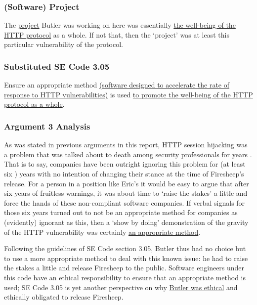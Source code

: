 \documentclass[11pt]{article}
\begin{document}
\begin{multicols}{2}
\subsubsection{(Software) Project}
The \uline{project} Butler was working on here was essentially \uline{the well-being of the HTTP protocol} as a whole. If not that, then the `project' was at least this particular vulnerability of the protocol.

\subsubsection{Substituted SE Code 3.05}
Ensure an appropriate method \uline{(software designed to accelerate the rate of response to HTTP vulnerabilities)} is used \uline{to promote the well-being of the HTTP protocol as a whole}.

\subsubsection{Argument 3 Analysis}
As was stated in previous arguments in this report, HTTP session hijacking was a problem that was talked about to death among security professionals for years \cite{firesheep-day-later}. That is to say, companies have been outright ignoring this problem for (at least six \cite{firesheep-day-later}) years with no intention of changing their stance at the time of Firesheep's release. For a person in a position like Eric's it would be easy to argue that after six years of fruitless warnings, it was about time to `raise the stakes' a little and force the hands of these non-compliant software companies. If verbal signals for those six years turned out to not be an appropriate method for companies as (evidently) ignorant as this, then a `show by doing' demonstration of the gravity of the HTTP vulnerability was certainly \uline{an appropriate method}.

Following the guidelines of SE Code section 3.05, Butler thus had no choice but to use a more appropriate method to deal with this known issue: he had to raise the stakes a little and release Firesheep to the public. Software engineers under this code have an ethical responsibility to ensure that an appropriate method is used; SE Code 3.05 is yet another perspective on why \uline{Butler was ethical} and ethically obligated to release Firesheep.






\end{multicols}
\end{document}
